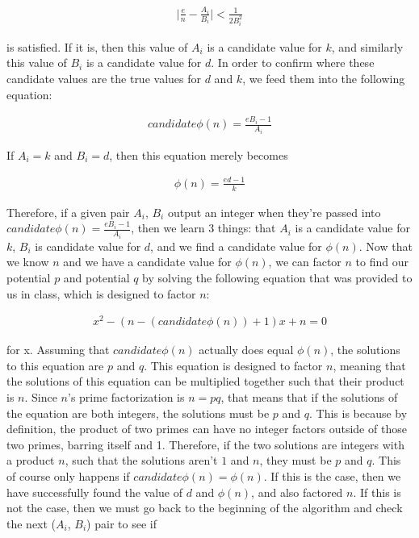 \documentclass[11pt]{article}
\theoremstyle{definition}
\begin{document}
\begin{enumerate}
\begin{enumerate}
\begin{align*}
    \mid \frac{e}{n} - \frac{A_i}{B_i} \mid < \frac{1}{2B_i^2}
\end{align*}

is satisfied. If it is, then this value of $A_i$ is a candidate value for $k$, and similarly this value of $B_i$ is a candidate value for $d$. In order to confirm where these candidate values are the true values for $d$ and $k$, we feed them into the following equation:

\begin{align*}
    candidate \phi(n) = \frac{eB_i - 1}{A_i}
\end{align*}

If $A_i = k$ and $B_i = d$, then this equation merely becomes

\begin{align*}
    \phi(n) = \frac{ed - 1}{k}
\end{align*}

Therefore, if a given pair $A_i$, $B_i$ output an integer when they're passed into $candidate \phi(n) = \frac{eB_i - 1}{A_i}$, then we learn 3 things: that $A_i$ is a candidate value for $k$, $B_i$ is candidate value for $d$, and we find a candidate value for $\phi(n)$. Now that we know $n$ and we have a candidate value for $\phi(n)$, we can factor $n$ to find our potential $p$ and potential $q$ by solving the following equation that was provided to us in class, which is designed to factor $n$:

\begin{align*}
    x^2 - (n - (candidate \phi(n)) + 1)x + n = 0
\end{align*}

for x. Assuming that $candidate\phi(n)$ actually does equal $\phi(n)$, the solutions to this equation are $p$ and $q$. This equation is designed to factor $n$, meaning that the solutions of this equation can be multiplied together such that their product is $n$. Since $n$'s prime factorization is $n = pq$, that means that if the solutions of the equation are both integers, the solutions must be $p$ and $q$. This is because by definition, the product of two primes can have no integer factors outside of those two primes, barring itself and 1. Therefore, if the two solutions are integers with a product $n$, such that the solutions aren't $1$ and $n$, they must be $p$ and $q$. This of course only happens if $candidate\phi(n) = \phi(n)$. If this is the case, then we have successfully found the value of $d$ and $\phi(n)$, and also factored $n$. If this is not the case, then we must go back to the beginning of the algorithm and check the next ($A_i$, $B_i$) pair to see if


\end{enumerate}
\end{enumerate}
\end{document}
